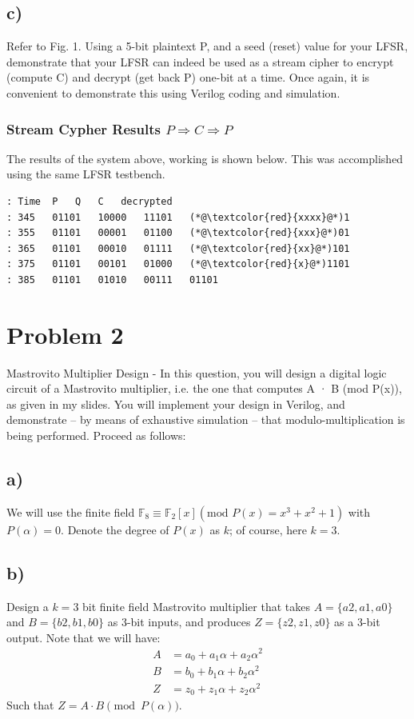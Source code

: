 \documentclass[a4paper,11pt]{exam}
\begin{document}
\subsection{c)}
\label{sec:org682501f}
Refer to Fig. 1. Using a 5-bit plaintext P, and a seed (reset) value for your LFSR, demonstrate that your LFSR can indeed be used as a stream cipher to encrypt (compute C) and decrypt (get back P) one-bit at a time. Once again, it is convenient to demonstrate this using Verilog coding and simulation.
\subsubsection{Stream Cypher Results \(P\Rightarrow{}C\Rightarrow{}P\)}
\label{sec:org6a6618e}
The results of the system above, working is shown below. This was accomplished using the same LFSR testbench.
\begin{lstlisting}
: Time	P	Q	C	decrypted
: 345	01101	10000	11101	(*@\textcolor{red}{xxxx}@*)1
: 355	01101	00001	01100	(*@\textcolor{red}{xxx}@*)01
: 365	01101	00010	01111	(*@\textcolor{red}{xx}@*)101
: 375	01101	00101	01000	(*@\textcolor{red}{x}@*)1101
: 385	01101	01010	00111	01101
  \end{lstlisting}

\section{Problem 2}
\label{sec:org51be2ca}
Mastrovito Multiplier Design - In this question, you will design a digital logic circuit of a Mastrovito multiplier, i.e. the one that computes A · B (mod P(x)), as given in my slides. You will implement your design in Verilog, and demonstrate – by means of exhaustive simulation – that modulo-multiplication is being performed. Proceed as follows:

\subsection{a)}
\label{sec:orgec8be3a}

We will use the finite field \(\mathbb{F}_8 \equiv \mathbb{F}_2[x] (\text{mod } P(x) = x^3 + x^2 + 1)\) with \(P(\alpha) = 0\). Denote the degree of  \(P(x)\) as \(k\); of course, here \(k = 3\).
\subsection{b)}
\label{sec:orgcb79204}
Design a \(k = 3\) bit finite field Mastrovito multiplier that takes \(A = \{a2 , a1 , a0\}\) and \(B = \{b2 , b1, b0 \}\) as 3-bit inputs, and produces \(Z = \{z2, z1 , z0 \}\) as a 3-bit output. Note that we will have:
\begin{align*}
A &= a_0 + a_1 \alpha + a_2\alpha^2\\
B &= b_0 + b_1 \alpha + b_2\alpha^2\\
Z &= z_0 + z_1 \alpha + z_2\alpha^2
\end{align*}
Such that \(Z = A \cdot B\pmod{P(\alpha)}\).
\end{document}
